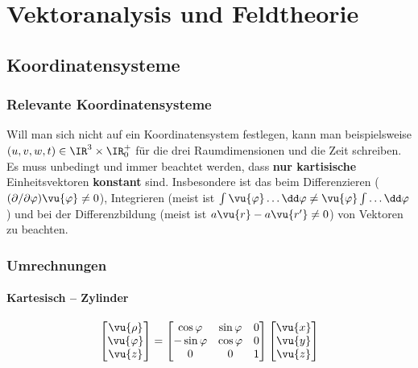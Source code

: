 \chapter{Vektoranalysis und Feldtheorie}
 \section{Koordinatensysteme}
\subsection{Relevante Koordinatensysteme}

Will man sich nicht auf ein Koordinatensystem festlegen, kann man beispielsweise $(u,v,w,t)\in\IR^3\times\IR_0^+$ für die drei Raumdimensionen und die Zeit schreiben. Es muss unbedingt und immer beachtet werden, dass \textbf{nur kartisische} Einheitsvektoren \textbf{konstant} sind. Insbesondere ist das beim Differenzieren ($(\partial/\partial \varphi )\vu{\varphi}\neq 0$), Integrieren (meist ist $\int \vu{\varphi} \dots \dd \varphi \neq \vu{\varphi}  \int \dots \dd \varphi$) und bei der Differenzbildung (meist ist $a\vu{r}-a\vu{{r'}}\neq 0$)  von Vektoren zu beachten.
\subsection{Umrechnungen}
\subsubsection{Kartesisch -- Zylinder} \label{kartzyl}
\begin{equation}
	\begin{bmatrix}
		\vu{\rho}    \\
		\vu{\varphi} \\
		\vu{z}
	\end{bmatrix}
	=
	\begin{bmatrix}
		\cos\varphi  & \sin\varphi & 0 \\
		-\sin\varphi & \cos\varphi & 0 \\
		0            & 0           & 1
	\end{bmatrix}
	\begin{bmatrix}
		\vu{x} \\
		\vu{y} \\
		\vu{z}
	\end{bmatrix}
\end{equation}
